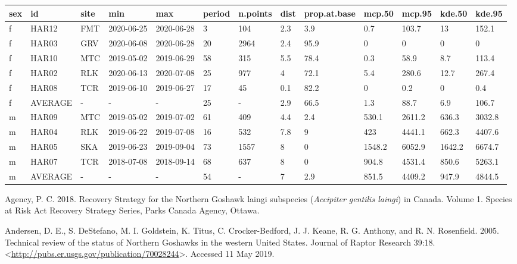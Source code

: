 \documentclass{sfuthesis}
\begin{document}
\begin{table}[H]
\centering
\begin{tabular}{l|l|l|l|l|l|l|l|l|l|l|l|l}
\hline
sex & id & site & min & max & period & n.points & dist & prop.at.base & mcp.50 & mcp.95 & kde.50 & kde.95\\
\hline
f & HAR12 & FMT & 2020-06-25 & 2020-06-28 & 3 & 104 & 2.3 & 3.9 & 0.7 & 103.7 & 13 & 152.1\\
\hline
f & HAR03 & GRV & 2020-06-08 & 2020-06-28 & 20 & 2964 & 2.4 & 95.9 & 0 & 0 & 0 & 0\\
\hline
f & HAR10 & MTC & 2019-05-02 & 2019-06-29 & 58 & 315 & 5.5 & 78.4 & 0.3 & 58.9 & 8.7 & 113.4\\
\hline
f & HAR02 & RLK & 2020-06-13 & 2020-07-08 & 25 & 977 & 4 & 72.1 & 5.4 & 280.6 & 12.7 & 267.4\\
\hline
f & HAR08 & TCR & 2019-06-10 & 2019-06-27 & 17 & 45 & 0.1 & 82.2 & 0 & 0.2 & 0 & 0.4\\
\hline
f & AVERAGE & - & - & - & 25 & - & 2.9 & 66.5 & 1.3 & 88.7 & 6.9 & 106.7\\
\hline
m & HAR09 & MTC & 2019-05-02 & 2019-07-02 & 61 & 409 & 4.4 & 2.4 & 530.1 & 2611.2 & 636.3 & 3032.8\\
\hline
m & HAR04 & RLK & 2019-06-22 & 2019-07-08 & 16 & 532 & 7.8 & 9 & 423 & 4441.1 & 662.3 & 4407.6\\
\hline
m & HAR05 & SKA & 2019-06-23 & 2019-09-04 & 73 & 1557 & 8 & 0 & 1548.2 & 6052.9 & 1642.2 & 6674.7\\
\hline
m & HAR07 & TCR & 2018-07-08 & 2018-09-14 & 68 & 637 & 8 & 0 & 904.8 & 4531.4 & 850.6 & 5263.1\\
\hline
m & AVERAGE & - & - & - & 54 & - & 7 & 2.9 & 851.5 & 4409.2 & 947.9 & 4844.5\\
\hline
\end{tabular}
\end{table}

\hypertarget{refs}{}
\leavevmode\hypertarget{ref-parks_canada_agency_recovery_2018}{}%
Agency, P. C. 2018. Recovery Strategy for the Northern Goshawk laingi subspecies (\emph{Accipiter gentilis laingi}) in Canada. Volume 1. Species at Risk Act Recovery Strategy Series, Parks Canada Agency, Ottawa.

\leavevmode\hypertarget{ref-andersen_technical_2005}{}%
Andersen, D. E., S. DeStefano, M. I. Goldstein, K. Titus, C. Crocker-Bedford, J. J. Keane, R. G. Anthony, and R. N. Rosenfield. 2005. Technical review of the status of Northern Goshawks in the western United States. Journal of Raptor Research 39:18. \textless{}\url{http://pubs.er.usgs.gov/publication/70028244}\textgreater. Accessed 11 May 2019.
\end{document}

